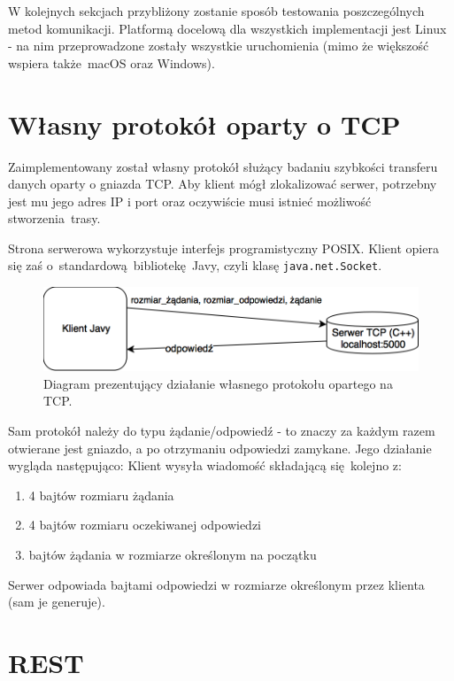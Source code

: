 W kolejnych sekcjach przybliżony zostanie sposób testowania poszczególnych metod komunikacji. Platformą docelową dla wszystkich implementacji jest Linux - na nim przeprowadzone zostały wszystkie uruchomienia (mimo że większość wspiera także macOS oraz Windows).

\section{Własny protokół oparty o TCP}

Zaimplementowany został własny protokół służący badaniu szybkości transferu danych oparty o gniazda TCP. Aby klient mógł zlokalizować serwer, potrzebny jest mu jego adres IP i port oraz oczywiście musi istnieć możliwość stworzenia trasy.

Strona serwerowa wykorzystuje interfejs programistyczny POSIX. Klient opiera się zaś o~standardową bibliotekę Javy, czyli klasę \texttt{java.net.Socket}.

\begin{figure}[h!]
    \centering
    \includegraphics[width=\textwidth,height=\textheight,keepaspectratio]{img/tcp_impl_diagram.png}
    \caption{Diagram prezentujący działanie własnego protokołu opartego na TCP.}
\end{figure}

Sam protokół należy do typu żądanie/odpowiedź - to znaczy za każdym razem otwierane jest gniazdo, a po otrzymaniu odpowiedzi zamykane. Jego działanie wygląda następująco:
\newline
Klient wysyła wiadomość składającą się kolejno z:
\begin{enumerate}
    \item 4 bajtów rozmiaru żądania
    \item 4 bajtów rozmiaru oczekiwanej odpowiedzi
    \item bajtów żądania w rozmiarze określonym na początku
\end{enumerate}
Serwer odpowiada bajtami odpowiedzi w rozmiarze określonym przez klienta (sam je generuje).


\section{REST}

